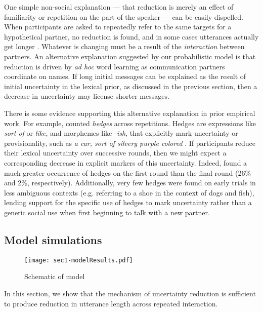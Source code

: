 One simple non-social explanation --- that reduction is merely an effect of familiarity or repetition on the part of the speaker --- can be easily dispelled. 
When participants are asked to repeatedly refer to the same targets for a hypothetical partner, no reduction is found, and in some cases utterances actually get longer \cite{HupetChantraine92_CollaborationOrRepitition}. 
Whatever is changing must be a result of the \emph{interaction} between partners.
An alternative explanation suggested by our probabilistic model is that reduction is driven by \emph{ad hoc} word learning as communication partners coordinate on names. 
If long initial messages can be explained as the result of initial uncertainty in the lexical prior, as discussed in the previous section, then a decrease in uncertainty may license shorter messages.

There is some evidence supporting this alternative explanation in prior empirical work.
For example,  counted \emph{hedges} across repetitions.
Hedges are expressions like \emph{sort of} or \emph{like}, and morphemes like \emph{-ish}, that explicitly mark uncertainty or provisionality, such as \emph{a car, sort of silvery purple colored} \cite{BrennanClark96_ConceptualPactsConversation,Fraser10_Hedging,MedlockBriscoe07_HedgeClassification}.
If participants reduce their lexical uncertainty over successive rounds, then we might expect a corresponding decrease in explicit markers of this uncertainty. 
Indeed,  found a much greater occurrence of hedges on the first round than the final round (26\% and 2\%, respectively).
Additionally, very few hedges were found on early trials in less ambiguous contexts (e.g. referring to a shoe in the context of dogs and fish), lending support for the specific use of hedges to mark uncertainty rather than a generic social use when first beginning to talk with a new partner.

\subsection{Model simulations}

\begin{figure*}
\centering
    \texttt{[image: sec1-modelResults.pdf]}
  \caption{Schematic of model}
  \label{fig:sec1model}
\end{figure*}


In this section, we show that the mechanism of uncertainty reduction is sufficient to produce reduction in utterance length across repeated interaction.

